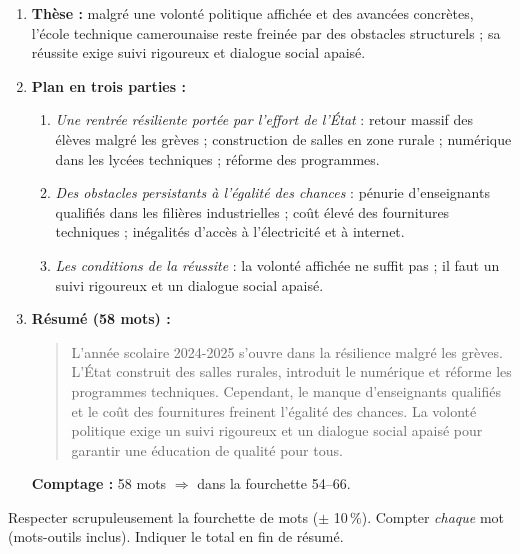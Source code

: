 \documentclass[11pt]{article}
\begin{document}
\begin{corrige}
\begin{enumerate}
    \item \textbf{Thèse :} malgré une volonté politique affichée et des avancées concrètes, l'école technique camerounaise reste freinée par des obstacles structurels ; sa réussite exige suivi rigoureux et dialogue social apaisé.
    \item \textbf{Plan en trois parties :}
    \begin{enumerate}
        \item \emph{Une rentrée résiliente portée par l'effort de l'État} : retour massif des élèves malgré les grèves ; construction de salles en zone rurale ; numérique dans les lycées techniques ; réforme des programmes.
        \item \emph{Des obstacles persistants à l'égalité des chances} : pénurie d'enseignants qualifiés dans les filières industrielles ; coût élevé des fournitures techniques ; inégalités d'accès à l'électricité et à internet.
        \item \emph{Les conditions de la réussite} : la volonté affichée ne suffit pas ; il faut un suivi rigoureux et un dialogue social apaisé.
    \end{enumerate}
    \item \textbf{Résumé (58 mots) :}
    \begin{quote}
    L'année scolaire 2024-2025 s'ouvre dans la résilience malgré les grèves. L'État construit des salles rurales, introduit le numérique et réforme les programmes techniques. Cependant, le manque d'enseignants qualifiés et le coût des fournitures freinent l'égalité des chances. La volonté politique exige un suivi rigoureux et un dialogue social apaisé pour garantir une éducation de qualité pour tous.
    \end{quote}
    \textbf{Comptage :} 58 mots $\Rightarrow$ dans la fourchette 54--66.
\end{enumerate}
\end{corrige}

\begin{attention}
Respecter scrupuleusement la fourchette de mots ($\pm$ 10\,\%). Compter \emph{chaque} mot (mots-outils inclus). Indiquer le total en fin de résumé.
\end{attention}
\end{document}
